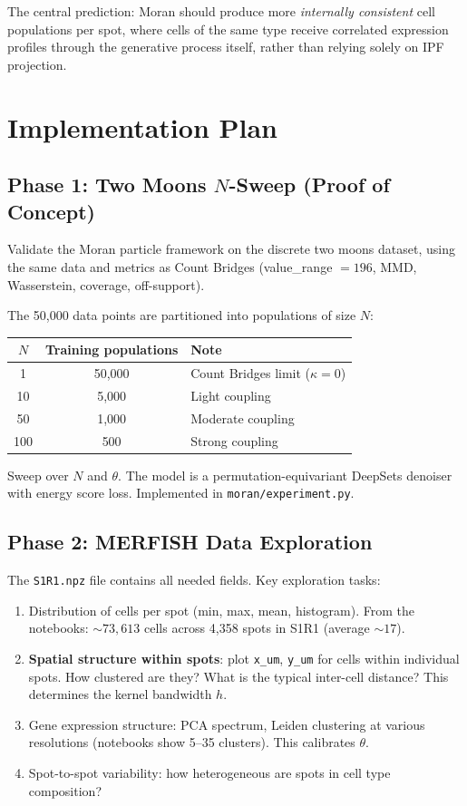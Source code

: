 \documentclass[11pt]{article}
\begin{document}
The central prediction: Moran should produce more \emph{internally consistent} cell populations per spot, where cells of the same type receive correlated expression profiles through the generative process itself, rather than relying solely on IPF projection.

\section{Implementation Plan}

\subsection{Phase 1: Two Moons $N$-Sweep (Proof of Concept)}

Validate the Moran particle framework on the discrete two moons dataset, using the same data and metrics as Count Bridges (value\_range $= 196$, MMD, Wasserstein, coverage, off-support).

The 50,000 data points are partitioned into populations of size $N$:
\begin{center}
\begin{tabular}{ccl}
\toprule
$N$ & Training populations & Note \\
\midrule
1 & 50,000 & Count Bridges limit ($\kappa = 0$) \\
10 & 5,000 & Light coupling \\
50 & 1,000 & Moderate coupling \\
100 & 500 & Strong coupling \\
\bottomrule
\end{tabular}
\end{center}

Sweep over $N$ and $\theta$. The model is a permutation-equivariant DeepSets denoiser with energy score loss. Implemented in \texttt{moran/experiment.py}.

\subsection{Phase 2: MERFISH Data Exploration}

The \texttt{S1R1.npz} file contains all needed fields. Key exploration tasks:
\begin{enumerate}
  \item Distribution of cells per spot (min, max, mean, histogram). From the notebooks: ${\sim}73{,}613$ cells across 4{,}358 spots in S1R1 (average ${\sim}17$).
  \item \textbf{Spatial structure within spots}: plot \texttt{x\_um}, \texttt{y\_um} for cells within individual spots. How clustered are they? What is the typical inter-cell distance? This determines the kernel bandwidth $h$.
  \item Gene expression structure: PCA spectrum, Leiden clustering at various resolutions (notebooks show 5--35 clusters). This calibrates $\theta$.
  \item Spot-to-spot variability: how heterogeneous are spots in cell type composition?
\end{enumerate}
\end{document}
